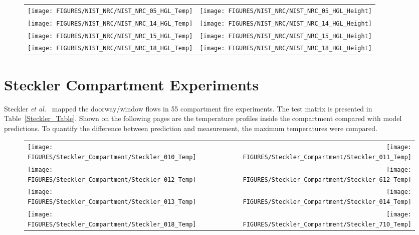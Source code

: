 \begin{figure}[p]
\begin{tabular*}{\textwidth}{l@{\extracolsep{\fill}}r}
\texttt{[image: FIGURES/NIST\_NRC/NIST\_NRC\_05\_HGL\_Temp]} &
\texttt{[image: FIGURES/NIST\_NRC/NIST\_NRC\_05\_HGL\_Height]} \\
\texttt{[image: FIGURES/NIST\_NRC/NIST\_NRC\_14\_HGL\_Temp]} &
\texttt{[image: FIGURES/NIST\_NRC/NIST\_NRC\_14\_HGL\_Height]} \\
\texttt{[image: FIGURES/NIST\_NRC/NIST\_NRC\_15\_HGL\_Temp]} &
\texttt{[image: FIGURES/NIST\_NRC/NIST\_NRC\_15\_HGL\_Height]} \\
\texttt{[image: FIGURES/NIST\_NRC/NIST\_NRC\_18\_HGL\_Temp]} &
\texttt{[image: FIGURES/NIST\_NRC/NIST\_NRC\_18\_HGL\_Height]}
\end{tabular*}
\end{figure}


\clearpage


\section{Steckler Compartment Experiments}

Steckler {\em et al.}~\cite{Steckler:NBSIR_82-2520} mapped the doorway/window flows in 55 compartment fire experiments. The test matrix is presented in Table~\ref{Steckler_Table}. Shown on the following pages are the temperature profiles inside the compartment compared with model predictions. To quantify the difference between prediction and measurement, the maximum temperatures were compared.

\newpage

\begin{figure}[p]
\begin{tabular*}{\textwidth}{l@{\extracolsep{\fill}}r}
\texttt{[image: FIGURES/Steckler\_Compartment/Steckler\_010\_Temp]} &
\texttt{[image: FIGURES/Steckler\_Compartment/Steckler\_011\_Temp]} \\
\texttt{[image: FIGURES/Steckler\_Compartment/Steckler\_012\_Temp]} &
\texttt{[image: FIGURES/Steckler\_Compartment/Steckler\_612\_Temp]} \\
\texttt{[image: FIGURES/Steckler\_Compartment/Steckler\_013\_Temp]} &
\texttt{[image: FIGURES/Steckler\_Compartment/Steckler\_014\_Temp]} \\
\texttt{[image: FIGURES/Steckler\_Compartment/Steckler\_018\_Temp]} &
\texttt{[image: FIGURES/Steckler\_Compartment/Steckler\_710\_Temp]}
\end{tabular*}
\label{Steckler_Temp_1}
\end{figure}

